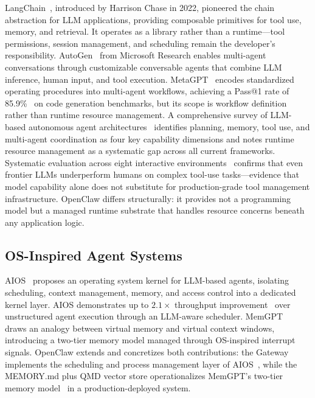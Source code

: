 \documentclass[journal]{IEEEtran}
\begin{document}
LangChain~\cite{chase2022langchain}, introduced by Harrison Chase in 2022,
pioneered the chain abstraction for LLM applications, providing composable
primitives for tool use, memory, and retrieval. It operates as a library
rather than a runtime---tool permissions, session management, and scheduling
remain the developer's responsibility. AutoGen~\cite{wu2023autogen} from
Microsoft Research enables multi-agent conversations through customizable
conversable agents that combine LLM inference, human input, and tool
execution. MetaGPT~\cite{hong2023metagpt} encodes standardized operating
procedures into multi-agent workflows, achieving a Pass@1 rate of
85.9\%~\cite{hong2023metagpt} on code generation benchmarks, but its scope is
workflow definition rather than runtime resource management. A comprehensive
survey of LLM-based autonomous agent architectures~\cite{wang2023survey}
identifies planning, memory, tool use, and multi-agent coordination as four
key capability dimensions and notes runtime resource management as a
systematic gap across all current frameworks. Systematic evaluation across
eight interactive environments~\cite{liu2023agentbench} confirms that even
frontier LLMs underperform humans on complex tool-use tasks---evidence that
model capability alone does not substitute for production-grade tool
management infrastructure. OpenClaw differs structurally: it provides not
a programming model but a managed runtime substrate that handles resource
concerns beneath any application logic.

\subsection{OS-Inspired Agent Systems}

AIOS~\cite{mei2024aios} proposes an operating system kernel for LLM-based
agents, isolating scheduling, context management, memory, and access control
into a dedicated kernel layer. AIOS demonstrates up to $2.1\times$ throughput
improvement~\cite{mei2024aios} over unstructured agent execution through an
LLM-aware scheduler. MemGPT~\cite{packer2023memgpt} draws an analogy between
virtual memory and virtual context windows, introducing a two-tier memory
model managed through OS-inspired interrupt signals. OpenClaw extends and
concretizes both contributions: the Gateway implements the scheduling and
process management layer of AIOS~\cite{mei2024aios}, while the MEMORY.md plus
QMD vector store operationalizes MemGPT's two-tier memory
model~\cite{packer2023memgpt} in a production-deployed system.
\end{document}
